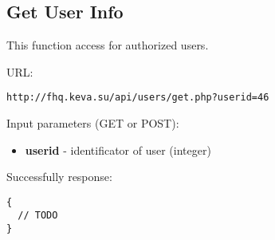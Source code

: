 \subsection{Get User Info}
\par

This function access for authorized users.

URL:
\begin{Verbatim}[frame=single]
http://fhq.keva.su/api/users/get.php?userid=46
\end{Verbatim}

Input parameters (GET or POST):
\begin{itemize}
  \item \textbf{userid} - identificator of user (integer)
\end{itemize}

Successfully response:  \\
\begin{Verbatim}[frame=single]
{
  // TODO
}
\end{Verbatim}

~
